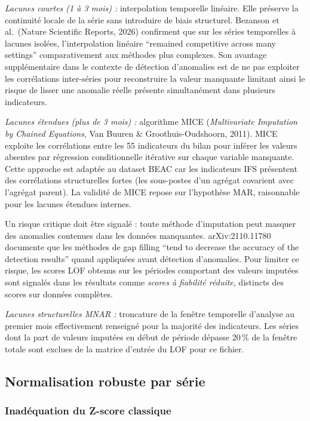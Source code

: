 \documentclass[12pt,a4paper]{article}
\begin{document}
\textit{Lacunes courtes (1 à 3 mois) :} interpolation temporelle linéaire.
Elle préserve la continuité locale de la série sans introduire de biais
structurel. Bezanson et al.\ (Nature Scientific Reports, 2026) confirment
que sur les séries temporelles à lacunes isolées, l'interpolation linéaire
``remained competitive across many settings'' comparativement aux méthodes
plus complexes. Son avantage supplémentaire dans le contexte de détection
d'anomalies est de ne pas exploiter les corrélations inter-séries pour
reconstruire la valeur manquante  limitant ainsi le risque de lisser une
anomalie réelle présente simultanément dans plusieurs indicateurs.

\textit{Lacunes étendues (plus de 3 mois) :} algorithme MICE
(\textit{Multivariate Imputation by Chained Equations}, Van Buuren \&
Groothuis-Oudshoorn, 2011). MICE exploite les corrélations entre les 55
indicateurs du bilan pour inférer les valeurs absentes par régression
conditionnelle itérative sur chaque variable manquante. Cette approche est
adaptée au dataset BEAC car les indicateurs IFS présentent des corrélations
structurelles fortes (les sous-postes d'un agrégat covarient avec l'agrégat
parent). La validité de MICE repose sur l'hypothèse MAR, raisonnable pour
les lacunes étendues internes.

Un risque critique doit être signalé : toute méthode d'imputation peut masquer
des anomalies contenues dans les données manquantes. arXiv:2110.11780 documente
que les méthodes de gap filling ``tend to decrease the accuracy of the detection
results'' quand appliquées avant détection d'anomalies. Pour limiter ce risque,
les scores LOF obtenus sur les périodes comportant des valeurs imputées sont
signalés dans les résultats comme \textit{scores à fiabilité réduite}, distincts
des scores sur données complètes.

\textit{Lacunes structurelles MNAR :} troncature de la fenêtre temporelle
d'analyse au premier mois effectivement renseigné pour la majorité des
indicateurs. Les séries dont la part de valeurs imputées en début de période
dépasse 20\,\% de la fenêtre totale sont exclues de la matrice d'entrée du
LOF pour ce fichier.

\subsection{Normalisation robuste par série}

\subsubsection{Inadéquation du Z-score classique}
\end{document}
